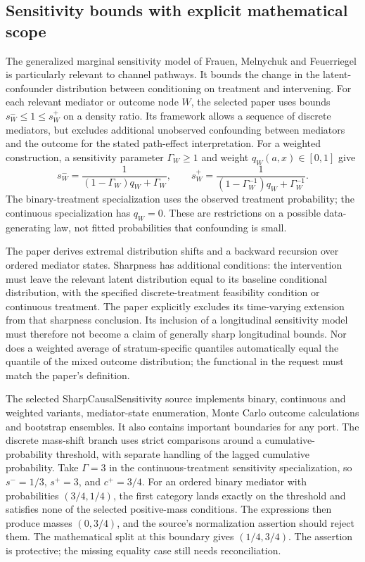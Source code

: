 \subsection{Sensitivity bounds with explicit mathematical scope}
The generalized marginal sensitivity model of Frauen, Melnychuk and Feuerriegel is particularly relevant to channel pathways. It bounds the change in the latent-confounder distribution between conditioning on treatment and intervening. For each relevant mediator or outcome node $W$, the selected paper uses bounds $s_W^-\leq1\leq s_W^+$ on a density ratio. Its framework allows a sequence of discrete mediators, but excludes additional unobserved confounding between mediators and the outcome for the stated path-effect interpretation. For a weighted construction, a sensitivity parameter $\Gamma_W\geq1$ and weight $q_W(a,x)\in[0,1]$ give
\[
 s_W^-=\frac{1}{(1-\Gamma_W)q_W+\Gamma_W},\qquad
 s_W^+=\frac{1}{(1-\Gamma_W^{-1})q_W+\Gamma_W^{-1}}.
\]
The binary-treatment specialization uses the observed treatment probability; the continuous specialization has $q_W=0$. These are restrictions on a possible data-generating law, not fitted probabilities that confounding is small. \cite{exec25_pymed_sharp_paper}

The paper derives extremal distribution shifts and a backward recursion over ordered mediator states. Sharpness has additional conditions: the intervention must leave the relevant latent distribution equal to its baseline conditional distribution, with the specified discrete-treatment feasibility condition or continuous treatment. The paper explicitly excludes its time-varying extension from that sharpness conclusion. Its inclusion of a longitudinal sensitivity model must therefore not become a claim of generally sharp longitudinal bounds. Nor does a weighted average of stratum-specific quantiles automatically equal the quantile of the mixed outcome distribution; the functional in the request must match the paper's definition. \cite{exec25_pymed_sharp_paper}

The selected SharpCausalSensitivity source implements binary, continuous and weighted variants, mediator-state enumeration, Monte Carlo outcome calculations and bootstrap ensembles. It also contains important boundaries for any port. The discrete mass-shift branch uses strict comparisons around a cumulative-probability threshold, with separate handling of the lagged cumulative probability. Take $\Gamma=3$ in the continuous-treatment sensitivity specialization, so $s^-=1/3$, $s^+=3$, and $c^+=3/4$. For an ordered binary mediator with probabilities $(3/4,1/4)$, the first category lands exactly on the threshold and satisfies none of the selected positive-mass conditions. The expressions then produce masses $(0,3/4)$, and the source's normalization assertion should reject them. The mathematical split at this boundary gives $(1/4,3/4)$. The assertion is protective; the missing equality case still needs reconciliation. \cite{exec25_pymed_sharp,exec25_pymed_choice}

